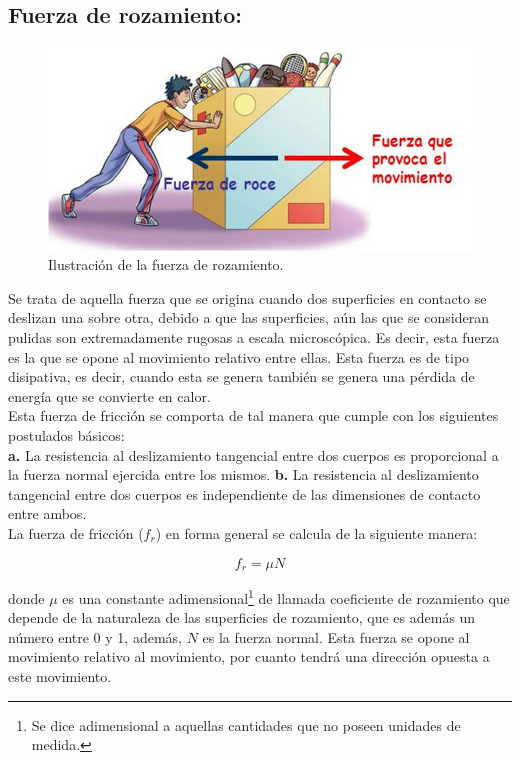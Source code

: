 \subsection{Fuerza de rozamiento:}

\begin{figure}[ht]
 \centering
 \includegraphics[scale=0.5]{images/fuerza-rozamiento.jpg}
 \caption{Ilustración de la fuerza de rozamiento.}\label{fr}
\end{figure}

Se trata de aquella fuerza que se origina cuando dos superficies en contacto se deslizan una sobre otra, debido a que las 
superficies, aún las que se consideran pulidas son extremadamente rugosas a escala microscópica. Es decir, esta fuerza es la que 
se opone al movimiento relativo entre ellas. Esta fuerza es de tipo disipativa, es decir, cuando esta se genera también se genera 
una pérdida de energía que se convierte en calor.\\

Esta fuerza de fricción se comporta de tal manera que cumple con los siguientes postulados básicos:\\

\textbf{a.} La resistencia al deslizamiento tangencial entre dos cuerpos es proporcional a la fuerza normal ejercida entre los 
mismos.
\textbf{b.} La resistencia al deslizamiento tangencial entre dos cuerpos es independiente de las dimensiones de contacto entre 
ambos.\\

La fuerza de fricción ($f_r$) en forma general se calcula de la siguiente manera:

\begin{equation}
f_r = \mu N
\end{equation}
  
donde $\mu$ es una constante adimensional\footnote{Se dice adimensional a aquellas cantidades que no poseen unidades de medida.} 
de llamada coeficiente de rozamiento que depende de la naturaleza de las superficies de rozamiento, que es además un número entre 
0 y 1, además, $N$ es la fuerza normal. Esta fuerza se opone al movimiento relativo al movimiento, por cuanto tendrá una 
dirección opuesta a este movimiento.  
    
